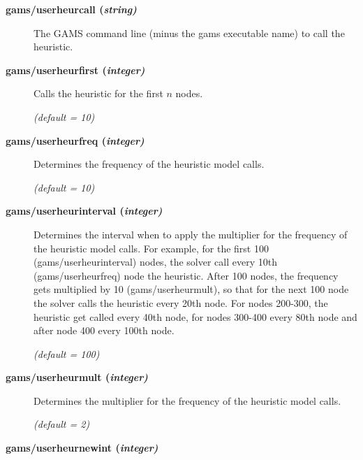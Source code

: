 \begin{description}
\item[\label{scipuserheurcall}\hypertarget{scipuserheurcall}
{\textbf{gams/userheurcall (\slshape{string})}}]\hspace{1.0in}

The GAMS command line (minus the gams executable name) to call the heuristic.


\item[\label{scipuserheurfirst}\hypertarget{scipuserheurfirst}
{\textbf{gams/userheurfirst (\slshape{integer})}}]\hspace{1.0in}

Calls the heuristic for the first $n$ nodes.

\textsl{(default = 10)}

\item[\label{scipuserheurfreq}\hypertarget{scipuserheurfreq}
{\textbf{gams/userheurfreq (\slshape{integer})}}]\hspace{1.0in}

Determines the frequency of the heuristic model calls.

\textsl{(default = 10)}

\item[\label{scipuserheurinterval}\hypertarget{scipuserheurinterval}
{\textbf{gams/userheurinterval (\slshape{integer})}}]\hspace{1.0in}

Determines the interval when to apply the multiplier for the frequency of the heuristic model calls.
For example, for the first 100 (gams/userheurinterval) nodes, the solver call every 10th (gams/userheurfreq) node the heuristic.
After 100 nodes, the frequency gets multiplied by 10 (gams/userheurmult), so that for the next 100 node the solver calls the heuristic every 20th node.
For nodes 200-300, the heuristic get called every 40th node, for nodes 300-400 every 80th node and after node 400 every 100th node.

\textsl{(default = 100)}

\item[\label{scipuserheurmult}\hypertarget{scipuserheurmult}
{\textbf{gams/userheurmult (\slshape{integer})}}]\hspace{1.0in}

Determines the multiplier for the frequency of the heuristic model calls.

\textsl{(default = 2)}

\item[\label{scipuserheurnewint}\hypertarget{scipuserheurnewint}
{\textbf{gams/userheurnewint (\slshape{integer})}}]\hspace{1.0in}


\end{description}
